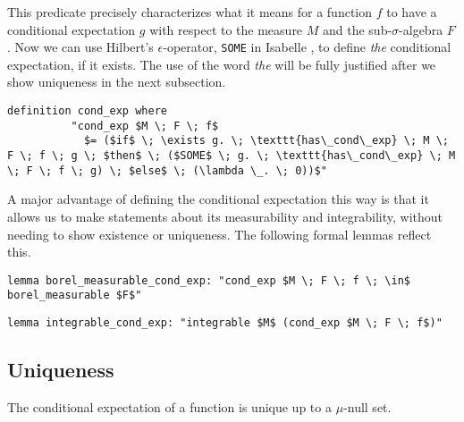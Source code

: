 This predicate precisely characterizes what it means for a function $f$ to have a conditional expectation $g$ with respect to the measure $M$ and the sub-$\sigma$-algebra $F$. Now we can use Hilbert's $\epsilon$-operator, \lstinline[language=isabelle]{SOME} in Isabelle \cite{Nipkow-Paulson-Wenzel:2002}, to define \textit{the} conditional expectation, if it exists. The use of the word \textit{the} will be fully justified after we show uniqueness in the next subsection.

\begin{isadefinition}
{\small
	\begin{lstlisting}[style=isabelle]
		definition cond_exp where 
		  "cond_exp $M \; F \; f$ 
			$= ($if$ \; \exists g. \; \texttt{has\_cond\_exp} \; M \; F \; f \; g \; $then$ \; ($SOME$ \; g. \; \texttt{has\_cond\_exp} \; M \; F \; f \; g) \; $else$ \; (\lambda \_. \; 0))$"
	\end{lstlisting}
}
\end{isadefinition}

A major advantage of defining the conditional expectation this way is that it allows us to make statements about its measurability and integrability, without needing to show existence or uniqueness. The following formal lemmas reflect this.

\begin{isalemma}
{\small
	\begin{lstlisting}[style=isabelle]
	lemma borel_measurable_cond_exp: "cond_exp $M \; F \; f \; \in$ borel_measurable $F$"
	\end{lstlisting}
}
\end{isalemma}

\begin{isalemma}
{\small
	\begin{lstlisting}[style=isabelle]
	lemma integrable_cond_exp: "integrable $M$ (cond_exp $M \; F \; f$)"
	\end{lstlisting}
}
\end{isalemma}

\subsection{Uniqueness}

The conditional expectation of a function is unique up to a $\mu$-null set. 

